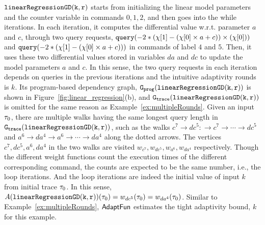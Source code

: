 $\mathtt{linearRegressionGD(k, r)}$ starts from initializing the linear model parameters and the counter variable in commands $0, 1, 2$,
and then goes into the while iterations.
In each iteration, it computes the differential value w.r.t. parameter
$a$ and $c$,
through two query requests, 
${\tt query}(-2 * (\chi[1] - (\chi[0]\times a + c)) \times (\chi[0]))$ and 
${\tt query}(-2 * (\chi[1] - (\chi[0]\times a + c)))$
in commands of label $4$ and $5$.
Then, it uses these two differential values stored in variables $da$ and $dc$
to update the model parameters $a$ and $c$.
In this sense, the two query requests in each iteration depends on queries in the previous iterations and the intuitive adaptivity rounds is $k$.
%
Its program-based dependency graph, $\mathtt{{G_{prog}}}(\mathtt{linearRegressionGD(k, r)})$ is shown in Figure~\ref{fig:linear_regression}(b),
and $\mathtt{{G_{trace}}}(\mathtt{linearRegressionGD(k, r)})$ is omitted for the same reason as Example~\ref{ex:multipleRounds}.
Given an input $\mathtt{\tau}_0$, there are multiple walks having the same longest query length in 
$\mathtt{{G_{trace}}}(\mathtt{linearRegressionGD(k, r)})$,
such as the walks 
$c^7 \to dc^5 : \to c^7 \to \cdots \to dc^5$ and
$a^6 \to da^4  \to a^6 \to \cdots \to da^4 $ along the 
dotted arrows.
The vertices $c^7, dc^5, a^6, da^4$ in the two walks are visited $w_{c^7}, w_{dc^5}, w_{a^6}, w_{da^4}$ respectively.
Though the different weight functions count the execution times of the different corresponding command,
the counts are expected to be the same number, i.e., the loop iterations.
And the loop iterations are indeed the initial value of input $k$ from initial trace $\mathtt{\tau}_0$.
In this sense, $A(\mathtt{linearRegressionGD(k, r)})(\mathtt{\tau}_0) = w_{dc^5}(\mathtt{\tau}_0) = w_{da^4}(\mathtt{\tau}_0)$.
Similar to Example~\ref{ex:multipleRounds}, $\textsf{AdaptFun}$ estimates the tight adaptivity bound, $k$ for this example.

%